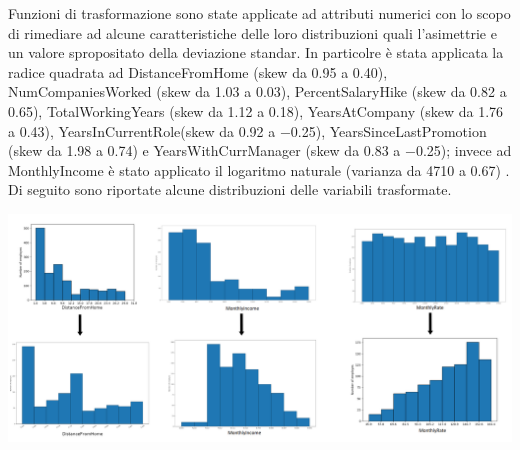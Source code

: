\documentclass[english]{article}
\begin{document}
Funzioni di trasformazione sono state applicate ad attributi numerici con lo scopo di rimediare ad alcune caratteristiche delle loro distribuzioni quali l'asimettrie e un valore spropositato della deviazione standar. In particolre è stata applicata la radice quadrata ad DistanceFromHome (skew da 0.95 a 0.40), NumCompaniesWorked (skew da 1.03 a 0.03), PercentSalaryHike (skew da 0.82 a 0.65), TotalWorkingYears (skew da 1.12 a 0.18), YearsAtCompany (skew da 1.76 a 0.43), YearsInCurrentRole(skew da 0.92 a $-$0.25), YearsSinceLastPromotion (skew da 1.98 a 0.74) e YearsWithCurrManager (skew da 0.83 a $-$0.25); invece ad MonthlyIncome è stato applicato il logaritmo naturale (varianza da 4710 a 0.67) . Di seguito sono riportate alcune distribuzioni delle variabili trasformate.

\begin{center}
\includegraphics[scale=0.3]{trasformer.png}
\end{center}
\end{document}
